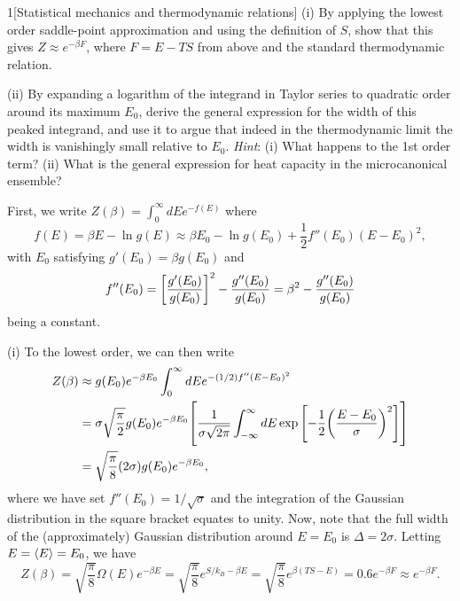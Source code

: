\documentclass[12pt]{article}
\begin{document}
\begin{problem}{1}[Statistical mechanics and thermodynamic relations]
\qquad(i) By applying the lowest order saddle-point approximation and using the
definition of $S$, show that this gives $Z\approx e^{-\beta F}$, where $F=E-TS$
from above and the standard thermodynamic relation.

\qquad(ii) By expanding a logarithm of the integrand in Taylor series to
quadratic order around its maximum $E_0$, derive the general expression for the
width of this peaked integrand, and use it to argue that indeed in the
thermodynamic limit the width is vanishingly small relative to
$E_0$. \textit{Hint}: (i) What happens to the 1st order term? (ii) What is the
general expression for heat capacity in the microcanonical ensemble?
\begin{solution}
First, we write $Z(\beta)=\int_0^\infty dE e^{-f(E)}$ where
\begin{equation}
    f(E)=\beta E-\ln g(E)\approx \beta E_0-\ln g(E_0)+\frac12f''(E_0)(E-E_0)^2,
\end{equation}
with $E_0$ satisfying $g'(E_0)=\beta g(E_0)$ and
\begin{equation}\label{p1d:fpp}
    f''(E_0)=\qty[\frac{g'(E_0)}{g(E_0)}]^2-\frac{g''(E_0)}{g(E_0)}
    =\beta^2-\frac{g''(E_0)}{g(E_0)}
\end{equation}
being a constant.

(i) To the lowest order, we can then write
\begin{align}
    Z(\beta)
    &\approx g(E_0)e^{-\beta E_0}\int_0^\infty dE e^{-(1/2)f''(E-E_0)^2}\notag\\
    &=\sigma\sqrt{\frac\pi2} g(E_0)e^{-\beta E_0}\qty[
    \frac1{\sigma \sqrt{2\pi}}\int_{-\infty}^\infty
    dE\exp\qty[-\frac12\qty(\frac{E-E_0}{\sigma})^2]]\notag\\
    &=\sqrt{\frac\pi8}(2\sigma)g(E_0)e^{-\beta E_0},
\end{align}
where we have set $f''(E_0)=1/\sqrt\sigma$ and the integration of the Gaussian
distribution in the square bracket equates to unity. Now, note that the full
width of the (approximately) Gaussian distribution around $E=E_0$ is
$\Delta=2\sigma$. Letting $E=\expval{E}=E_0$, we have
\begin{equation}
    Z(\beta)=\sqrt{\frac\pi8}\Omega(E)e^{-\beta E} 
    =\sqrt{\frac\pi8}e^{S/k_B-\beta E}
    =\sqrt{\frac\pi8}e^{\beta(TS-E)}
    =0.6 e^{-\beta F}
    \approx e^{-\beta F}.
\end{equation}


\end{solution}
\end{problem}
\end{document}
